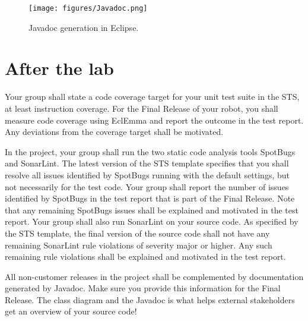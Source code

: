 \documentclass{scrreprt}
\begin{document}
\begin{figure}
\centering
\texttt{[image: figures/Javadoc.png]}
\caption{Javadoc generation in Eclipse.}
\label{fig:javadoc}
\end{figure}

\chapter{After the lab}
Your group shall state a code coverage target for your unit test suite in the STS, at least instruction coverage. For the Final Release of your robot, you shall measure code coverage using EclEmma and report the outcome in the test report. Any deviations from the coverage target shall be motivated.

In the project, your group shall run the two static code analysis tools SpotBugs and SonarLint. The latest version of the STS template specifies that you shall resolve all issues identified by SpotBugs running with the default settings, but not necessarily for the test code. Your group shall report the number of issues identified by SpotBugs in the test report that is part of the Final Release. Note that any remaining SpotBugs issues shall be explained and motivated in the test report. Your group shall also run SonarLint on your source code. As specified by the STS template, the final version of the source code shall not have any remaining SonarLint rule violations of severity major or higher. Any such remaining rule violations shall be explained and motivated in the test report.

All non-customer releases in the project shall be complemented by documentation generated by Javadoc. Make sure you provide this information for the Final Release. The class diagram and the Javadoc is what helps external stakeholders get an overview of your source code!
\end{document}
